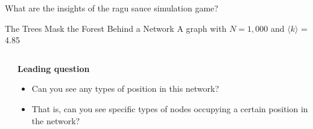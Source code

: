 \documentclass[notes, aspectratio=1610]{beamer}
\begin{document}
\begin{frame}{}{}
	\Large \centering What are the insights of the ragu sauce 
	simulation game?
\end{frame}

\begin{frame}{The Trees Mask the Forest Behind a Network}
	{A graph with $N = 1,000$ and $\langle k \rangle$ = 4.85 }
	\begin{columns}
		\begin{column}{0.5\textwidth}
			\centering 
			

		\end{column}
		\begin{column}{0.3\textwidth}
			\textbf{Leading question}

			\begin{itemize}
				\item 
				Can you see any types of position in this network?
				\item That is, can you see specific types of nodes 
				occupying a certain position in the network?
			\end{itemize}
		\end{column}
	\end{columns}
\end{frame}
\end{document}
